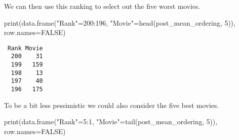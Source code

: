 \documentclass[
  letterpaper,
  DIV=11,
  numbers=noendperiod]{scrartcl}
\newenvironment{Shaded}{\begin{snugshade}}{\end{snugshade}}
\newcommand{\AttributeTok}[1]{\textcolor[rgb]{0.40,0.45,0.13}{#1}}
\newcommand{\ConstantTok}[1]{\textcolor[rgb]{0.56,0.35,0.01}{#1}}
\newcommand{\ControlFlowTok}[1]{\textcolor[rgb]{0.00,0.23,0.31}{#1}}
\newcommand{\DecValTok}[1]{\textcolor[rgb]{0.68,0.00,0.00}{#1}}
\newcommand{\FunctionTok}[1]{\textcolor[rgb]{0.28,0.35,0.67}{#1}}
\newcommand{\NormalTok}[1]{\textcolor[rgb]{0.00,0.23,0.31}{#1}}
\newcommand{\OtherTok}[1]{\textcolor[rgb]{0.00,0.23,0.31}{#1}}
\newcommand{\SpecialCharTok}[1]{\textcolor[rgb]{0.37,0.37,0.37}{#1}}
\newcommand{\StringTok}[1]{\textcolor[rgb]{0.13,0.47,0.30}{#1}}
\begin{document}
\begin{Shaded}
\end{Shaded}

We can then use this ranking to select out the five worst movies.

\begin{Shaded}
\begin{Highlighting}[]
\FunctionTok{print}\NormalTok{(}\FunctionTok{data.frame}\NormalTok{(}\StringTok{"Rank"}\OtherTok{=}\DecValTok{200}\SpecialCharTok{:}\DecValTok{196}\NormalTok{,}
                 \StringTok{"Movie"}\OtherTok{=}\FunctionTok{head}\NormalTok{(post\_mean\_ordering, }\DecValTok{5}\NormalTok{)),}
      \AttributeTok{row.names=}\ConstantTok{FALSE}\NormalTok{)}
\end{Highlighting}
\end{Shaded}

\begin{verbatim}
 Rank Movie
  200    31
  199   159
  198    13
  197    40
  196   175
\end{verbatim}

To be a bit less pessimistic we could also consider the five best
movies.

\begin{Shaded}
\begin{Highlighting}[]
\FunctionTok{print}\NormalTok{(}\FunctionTok{data.frame}\NormalTok{(}\StringTok{"Rank"}\OtherTok{=}\DecValTok{5}\SpecialCharTok{:}\DecValTok{1}\NormalTok{,}
                 \StringTok{"Movie"}\OtherTok{=}\FunctionTok{tail}\NormalTok{(post\_mean\_ordering, }\DecValTok{5}\NormalTok{)),}
      \AttributeTok{row.names=}\ConstantTok{FALSE}\NormalTok{)}
\end{Highlighting}
\end{Shaded}
\end{document}
